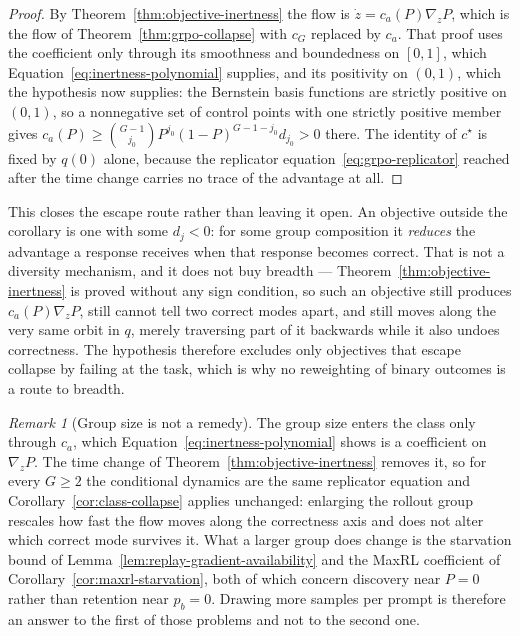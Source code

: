 \documentclass{article}
\newcommand{\1}{\mathbf 1}
\theoremstyle{remark}
\newtheorem{remark}[lemma]{Remark}
\theoremstyle{definition}
\theoremstyle{plain}
\begin{document}
\begin{proof}
By Theorem~\ref{thm:objective-inertness} the flow is
$\dot z=c_a(P)\nabla_zP$, which is the flow of
Theorem~\ref{thm:grpo-collapse} with $c_G$ replaced by $c_a$. That proof uses
the coefficient only through its smoothness and boundedness on $[0,1]$, which
Equation~\eqref{eq:inertness-polynomial} supplies, and its positivity on
$(0,1)$, which the hypothesis now supplies: the Bernstein basis functions are
strictly positive on $(0,1)$, so a nonnegative set of control points with one
strictly positive member gives $c_a(P)\ge\binom{G-1}{j_0}P^{j_0}(1-P)^{G-1-j_0}
d_{j_0}>0$ there. The identity of $c^\star$ is fixed by $q(0)$ alone, because
the replicator equation~\eqref{eq:grpo-replicator} reached after the time
change carries no trace of the advantage at all.
\end{proof}

This closes the escape route rather than leaving it open. An objective outside
the corollary is one with some $d_j<0$: for some group composition it
\emph{reduces} the advantage a response receives when that response becomes
correct. That is not a diversity mechanism, and it does not buy breadth ---
Theorem~\ref{thm:objective-inertness} is proved without any sign condition, so
such an objective still produces $c_a(P)\nabla_zP$, still cannot tell two
correct modes apart, and still moves along the very same orbit in $q$, merely
traversing part of it backwards while it also undoes correctness. The
hypothesis therefore excludes only objectives that escape collapse by failing
at the task, which is why no reweighting of binary outcomes is a route to
breadth.

\begin{remark}[Group size is not a remedy]
\label{rem:group-size-inert}
The group size enters the class only through $c_a$, which
Equation~\eqref{eq:inertness-polynomial} shows is a coefficient on
$\nabla_zP$. The time change of Theorem~\ref{thm:objective-inertness} removes
it, so for every $G\ge2$ the conditional dynamics are the same replicator
equation and Corollary~\ref{cor:class-collapse} applies unchanged: enlarging
the rollout group rescales how fast the flow moves along the correctness axis
and does not alter which correct mode survives it. What a larger group does
change is the starvation bound of
Lemma~\ref{lem:replay-gradient-availability} and the MaxRL coefficient of
Corollary~\ref{cor:maxrl-starvation}, both of which concern discovery near
$P=0$ rather than retention near $p_b=0$. Drawing more samples per prompt is
therefore an answer to the first of those problems and not to the second one.
\end{remark}
\end{document}
